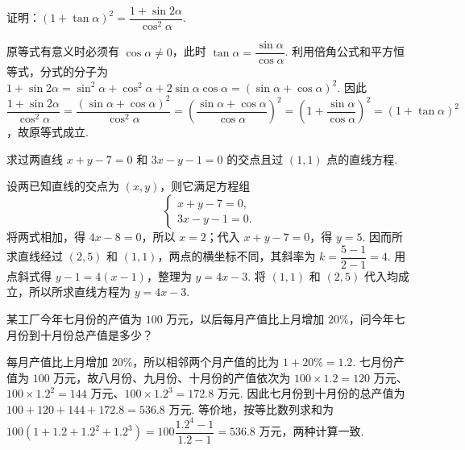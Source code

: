 \begin{problem}
证明：\(\left(1+\tan\alpha\right)^2=\dfrac{1+\sin2\alpha}{\cos^2\alpha}\).
\end{problem}

\begin{solution}
原等式有意义时必须有 \(\cos\alpha\neq0\)，此时 \(\tan\alpha=\dfrac{\sin\alpha}{\cos\alpha}\). 利用倍角公式和平方恒等式，分式的分子为 \(1+\sin2\alpha=\sin^2\alpha+\cos^2\alpha+2\sin\alpha\cos\alpha=\left(\sin\alpha+\cos\alpha\right)^2\). 因此 \(\dfrac{1+\sin2\alpha}{\cos^2\alpha}=\dfrac{\left(\sin\alpha+\cos\alpha\right)^2}{\cos^2\alpha}=\left(\dfrac{\sin\alpha+\cos\alpha}{\cos\alpha}\right)^2=\left(1+\dfrac{\sin\alpha}{\cos\alpha}\right)^2=\left(1+\tan\alpha\right)^2\)，故原等式成立.
\end{solution}

\begin{problem}
求过两直线 \(x+y-7=0\) 和 \(3x-y-1=0\) 的交点且过 \((1,1)\) 点的直线方程.
\end{problem}

\begin{solution}
设两已知直线的交点为 \((x,y)\)，则它满足方程组
\[
\begin{cases}
x+y-7=0,\\
3x-y-1=0.
\end{cases}
\]
将两式相加，得 \(4x-8=0\)，所以 \(x=2\)；代入 \(x+y-7=0\)，得 \(y=5\). 因而所求直线经过 \((2,5)\) 和 \((1,1)\)，两点的横坐标不同，其斜率为 \(k=\dfrac{5-1}{2-1}=4\). 用点斜式得 \(y-1=4\left(x-1\right)\)，整理为 \(y=4x-3\). 将 \((1,1)\) 和 \((2,5)\) 代入均成立，所以所求直线方程为 \(y=4x-3\).
\end{solution}

\begin{problem}
某工厂今年七月份的产值为 \(100\text{ 万元}\)，以后每月产值比上月增加 \(20\%\)，问今年七月份到十月份总产值是多少？
\end{problem}

\begin{solution}
每月产值比上月增加 \(20\%\)，所以相邻两个月产值的比为 \(1+20\%=1.2\). 七月份产值为 \(100\text{ 万元}\)，故八月份、九月份、十月份的产值依次为 \(100\times1.2=120\text{ 万元}\)、\(100\times1.2^2=144\text{ 万元}\)、\(100\times1.2^3=172.8\text{ 万元}\). 因此七月份到十月份的总产值为 \(100+120+144+172.8=536.8\text{ 万元}\). 等价地，按等比数列求和为 \(100\left(1+1.2+1.2^2+1.2^3\right)=100\dfrac{1.2^4-1}{1.2-1}=536.8\text{ 万元}\)，两种计算一致.
\end{solution}

